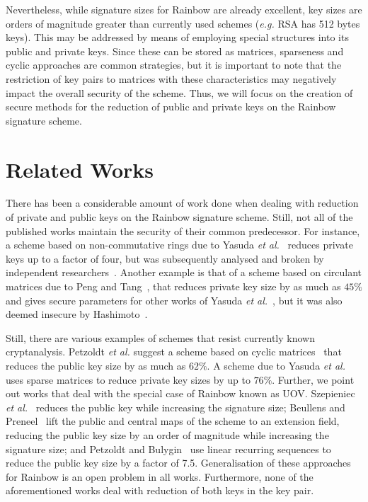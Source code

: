 \documentclass[10pt]{article}
\begin{document}
Nevertheless, while signature sizes for Rainbow are already excellent, key sizes are orders of magnitude greater than currently used schemes (\emph{e.g.} RSA has 512 bytes keys). This may be addressed by means of employing special structures into its public and private keys. Since these can be stored as matrices, sparseness and cyclic approaches are common strategies, but it is important to note that the restriction of key pairs to matrices with these characteristics may negatively impact the overall security of the scheme. Thus, we will focus on the creation of secure methods for the reduction of public and private keys on the Rainbow signature scheme.

\section{Related Works}

There has been a considerable amount of work done when dealing with reduction of private and public keys on the Rainbow signature scheme. Still, not all of the published works maintain the security of their common predecessor. For instance, a scheme based on non-commutative rings due to Yasuda \emph{et al.}~\cite{Yasuda:inproc:2012:feb} reduces private keys up to a factor of four, but was subsequently analysed and broken by independent researchers~\cite{Hashimoto:inproc:2013:feb,Thomae:inproc:2012:sep}. Another example is that of a scheme based on circulant matrices due to Peng and Tang~\cite{Peng:article:2017:jun}, that reduces private key size by as much as $45\%$ and gives secure parameters for other works of Yasuda \emph{et al.}~\cite{Yasuda:inproc:2013:may,Yasuda:inproc:2014:apr}, but it was also deemed insecure by Hashimoto~\cite{Hashimoto:misc:2018:oct}. 

Still, there are various examples of schemes that resist currently known cryptanalysis. Petzoldt \emph{et al.} suggest a scheme based on cyclic matrices~\cite{Petzoldt:inproc:2010:dec} that reduces the public key size by as much as $62\%$. A scheme due to Yasuda \emph{et al.}~\cite{Yasuda:article:2014:sep} uses sparse matrices to reduce private key sizes by up to $76\%$. Further, we point out works that deal with the special case of Rainbow known as UOV. Szepieniec \emph{et al.}~\cite{Szepieniec:inproc:2017:jun} reduces the public key while increasing the signature size; Beullens and Preneel~\cite{Beullens:inproc:2017:dec} lift the public and central maps of the scheme to an extension field, reducing the public key size by an order of magnitude while increasing the signature size; and Petzoldt and Bulygin~\cite{Petzoldt:inproc:2012:nov} use linear recurring sequences to reduce the public key size by a factor of 7.5. Generalisation of these approaches for Rainbow is an open problem in all works. Furthermore, none of the aforementioned works deal with reduction of both keys in the key pair.
\end{document}
